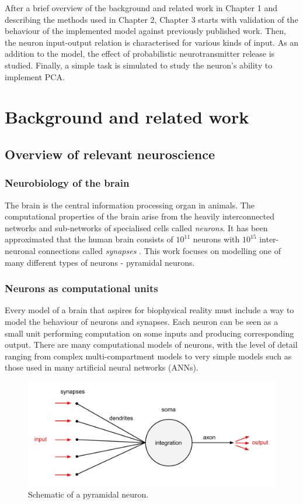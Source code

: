 \documentclass[a4paper,12pt]{report}
\theoremstyle{definition}
\begin{document}
After a brief overview of the background and related work in Chapter 1 and describing the methods used in Chapter 2, Chapter 3 starts with validation of the behaviour of the implemented model against previously published work. Then, the neuron input-output relation is characterised for various kinds of input. As an addition to the model, the effect of probabilistic neurotransmitter release is studied. Finally, a simple task is simulated to study the neuron's ability to implement PCA.



\chapter{Background and related work}


\section{Overview of relevant neuroscience}

\subsection{Neurobiology of the brain} %
The brain is the central information processing organ in animals. The computational properties of the brain arise from the heavily interconnected networks and sub-networks of specialised cells called \emph{neurons}. It has been approximated that the human brain consists of $10^{11}$ neurons with $10^{15}$ inter-neuronal connections called \emph{synapses} \cite{herculano2009human}. This work focuses on modelling one of many different types of neurons - pyramidal neurons.


\subsection{Neurons as computational units}
Every model of a brain that aspires for biophysical reality must include a way to model the behaviour of neurons and synapses. Each neuron can be seen as a small unit performing computation on some inputs and producing corresponding output. There are many computational models of neurons, with the level of detail ranging from complex multi-compartment models to very simple models such as those used in many artificial neural networks (ANNs). 

\begin{figure}[h]
    \includegraphics[width=\textwidth]{figures/fig1.pdf}
    \caption{Schematic of a pyramidal neuron.}
    \label{fig:pyramidal}
\end{figure}
\end{document}
